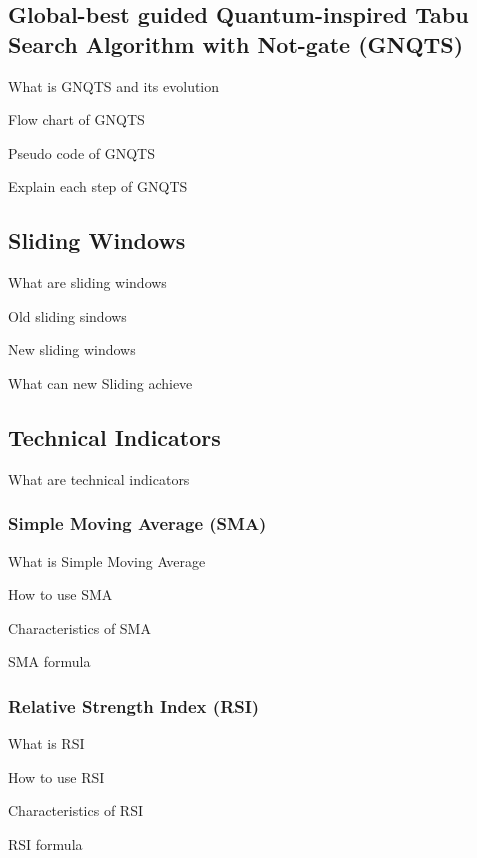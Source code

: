 \documentclass[../main.tex]{subfiles}
\begin{document}
\subsection{Global-best guided Quantum-inspired Tabu Search Algorithm with Not-gate (GNQTS)}
What is GNQTS and its evolution

Flow chart of GNQTS

Pseudo code of GNQTS

Explain each step of GNQTS

\subsection{Sliding Windows}
What are sliding windows

Old sliding sindows

New sliding windows

What can new Sliding achieve

\subsection{Technical Indicators}
What are technical indicators

\subsubsection{Simple Moving Average (SMA)}
What is Simple Moving Average

How to use SMA

Characteristics of SMA

SMA formula

\subsubsection{Relative Strength Index (RSI)}
What is RSI

How to use RSI

Characteristics of RSI

RSI formula
\end{document}
